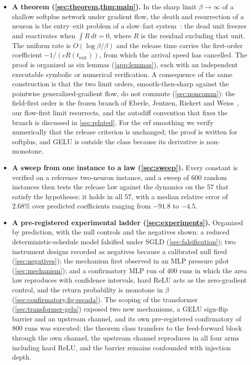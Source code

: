 \documentclass[11pt]{article}
\theoremstyle{definition}
\theoremstyle{remark}
\newcommand{\texit}{t_{\mathrm{exit}}}
\begin{document}
\begin{itemize}
\item \textbf{A theorem (\cref{sec:theorem,thm:main}).} In the sharp limit
$\beta\to\infty$ of a shallow softplus network under gradient flow, the death and
resurrection of a neuron is the entry--exit problem of a slow--fast
system~\cite{DMS16}: the dead unit freezes and reactivates when $\int R\,dt=0$,
where $R$ is the residual excluding that unit. The uniform rate is
$O(\log\beta/\beta)$ and the release time carries the first-order coefficient
$-1/(cR(\texit))$, from which the arrival speed has cancelled. The proof is
organized as six lemmas (\cref{app:lemmas}), each with an independent executable
symbolic or numerical verification. A consequence of the same construction is
that the two limit orders, smooth-then-sharp against the pointwise
generalized-gradient flow, do not commute (\cref{sec:noncomm}): the field-first
order is the frozen branch of Eberle, Jentzen, Riekert and Weiss~\cite{EJRW23},
our flow-first limit resurrects, and the autodiff convention that fixes the
branch is discussed in \cref{sec:related}. For the erf smoothing we verify
numerically that the release criterion is unchanged; the proof is written for
softplus, and GELU is outside the class because its derivative is non-monotone.

\item \textbf{A sweep from one instance to a law (\cref{sec:sweep}).} Every
constant is verified on a reference two-neuron instance, and a sweep of 600
random instances then tests the release law against the dynamics on the 57 that
satisfy the hypotheses: it holds in all 57, with a median relative error of
$2.68\%$ over predicted coefficients ranging from $-91.8$ to $-4.5$.

\item \textbf{A pre-registered experimental ladder (\cref{sec:experiments}).}
Organized by prediction, with the null controls and the negatives shown: a
reduced deterministic-schedule model falsified under SGLD
(\cref{sec:falsification}); two instrument designs recorded as negatives because
a calibrated null fired (\cref{sec:negatives}); the mechanism first observed in
an MLP pressure pilot (\cref{sec:mechanism}); and a confirmatory MLP run of 400
runs in which the area law reproduces with confidence intervals, hard ReLU acts
as the zero-gradient control, and the return probability is monotone in $\beta$
(\cref{sec:confirmatory,fig:escada}). The scoping of the transformer
(\cref{sec:transformer-gelu}) exposed two new mechanisms, a GELU sign-flip barrier and
an upstream channel, and its own pre-registered confirmatory of 800 runs was
executed: the theorem class transfers to the feed-forward block through the own
channel, the upstream channel reproduces in all four arms including hard ReLU,
and the barrier remains confounded with injection depth.


\end{itemize}
\end{document}
